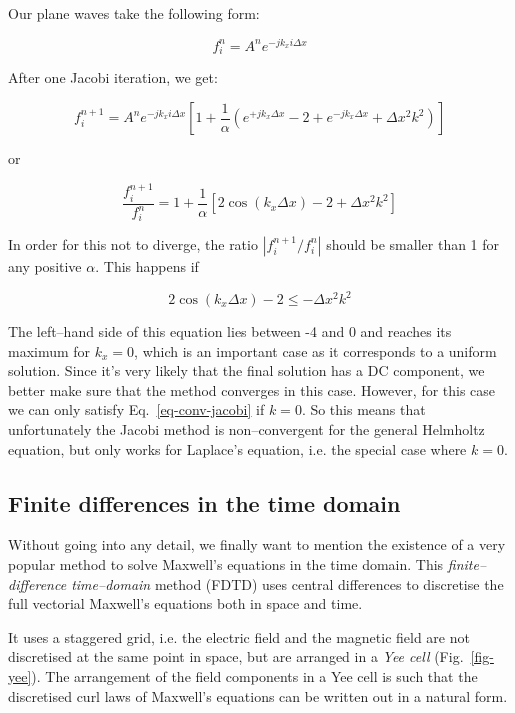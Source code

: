 Our plane waves take the following form:

\begin{equation}
f_i^n = A^n e^{-j k_x i \Delta x}
\end{equation} 

After one Jacobi iteration, we get:

\begin{equation}
f_i^{n+1} = A^n e^{-j k_x i \Delta x} \left[{ 1 + \frac{1}{\alpha}\left(e^{+ j k_x  \Delta x} - 2+  e^{-j k_x  \Delta x} + \Delta x^2 k^2\right)}\right]
\end{equation} 

or

\begin{equation}
\frac{f_i^{n+1}}{f_i^{n}} =  1 + \frac{1}{\alpha}\left[2 \cos ( k_x  \Delta x) - 2 + \Delta x^2 k^2\right]
\end{equation} 

In order for this not to diverge, the ratio  $|f_i^{n+1} / f_i^{n}|$ should be smaller than 1 for any positive $\alpha$. This happens if

\begin{equation}
2 \cos ( k_x  \Delta x) - 2 \le - \Delta x^2 k^2 \label{eq-conv-jacobi}
\end{equation} 

The left--hand side of this equation lies between -4 and 0 and reaches its maximum for $k_x=0$, which is an important case as it corresponds to a uniform solution. Since it's very likely that the final solution has a DC component, we better make sure that the method converges in this case. However, for this case we can only satisfy Eq.~\ref{eq-conv-jacobi} if $k=0$. So this means that unfortunately the Jacobi method is non--convergent for the general Helmholtz equation, but only works for Laplace's equation, i.e. the special case where $k=0$.

\subsection{Finite differences in the time domain}

Without going into any detail, we finally want to mention the existence of a very popular method to solve Maxwell's equations in the time domain. This \emph{finite--difference time--domain} method (FDTD) uses central differences to discretise the full vectorial Maxwell's equations both in space and time.

It uses a staggered grid, i.e. the electric field and the magnetic field are not discretised at the same point in space, but are arranged in a \emph{Yee cell} (Fig.~\ref{fig-yee}). The arrangement of the field components in a Yee cell is such that the discretised curl laws of Maxwell's equations can be written out in a natural form.

